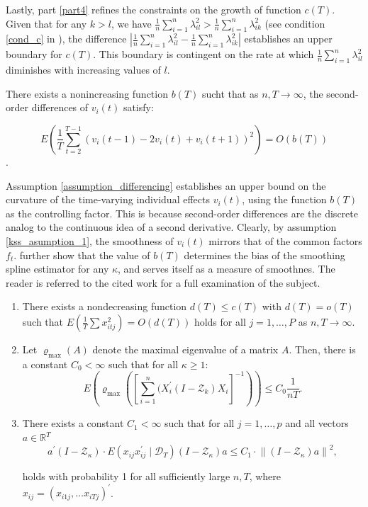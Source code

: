    Lastly, part \ref{part4} refines the constraints on the growth of function \(c(T)\). Given that for any \(k > l\), we have \(\frac{1}{n}\sum_{i=1}^n \lambda_{il}^2 > \frac{1}{n}\sum_{i=1}^n \lambda_{ik}^2\) (see condition \ref{cond_c} in ), the difference \(|\frac{1}{n}\sum_{i=1}^n \lambda_{il}^2 - \frac{1}{n}\sum_{i=1}^n \lambda_{ik}^2|\) establishes an upper boundary for \(c(T)\). This boundary is contingent on the rate at which \(\frac{1}{n}\sum_{i=1}^n \lambda_{il}^2\) diminishes with increasing values of \(l\).
    \begin{assumption}\label{assumption_differencing}
        There exists a nonincreasing function $b(T)$ sucht that as $n, T \to \infty$, the second-order differences of $v_i(t)$ satisfy:

        $$ E \left( \frac{1}{T} \sum_{t=2}^{T-1} \left(v_i(t-1) - 2v_i(t) + v_i(t+1) \right)^2 \right) = O(b(T))$$.
    \end{assumption}
     Assumption \ref{assumption_differencing} establishes an upper bound on the curvature of the time-varying individual effects \( v_i(t) \), using the function \( b(T) \) as the controlling factor. This is because second-order differences are the discrete analog to the continuous idea of a second derivative. Clearly, by assumption \ref{kss_asumption_1}, the smoothness of $v_i(t)$ mirrors that of the common factors $f_t$. \citet{kneip2012new} further show that the value of $b(T)$ determines the bias of the smoothing spline estimator for any $\kappa$, and serves itself as a measure of smoothnes. The reader is referred to the cited work for a full examination of the subject. 
    \begin{assumption}\label{assumption_X}
    \begin{enumerate} [label = (\roman*)] The following conditions are satisfied: 
        \item There exists a nondecreasing function $d(T) \leq c(T)$ with $d(T) = o(T)$ such that $ E(\frac{1}{T} \sum x_{itj}^2) = O(d(T))$ holds for all $j = 1, \ldots, P$ as $n, T \to \infty$.\label{first}
        \item  Let $\varrho_{\text{max}}(A)$ denote the maximal eigenvalue of a matrix $A$. Then, there is a constant $C_0 < \infty$ such that for all $\kappa \geq 1$:
        $$ E \left( \varrho_{\max} \left( \left[ \sum_{i=1}^n ( X_i ^\prime (I - \mathcal{Z}_k) X_i \right]^{-1} \right) \right) \leq C_0 \frac{1}{nT} . $$ \label{second}

        
        \item There exists a constant $C_1<\infty$ such that for all $j=1, \ldots, p$ and all vectors $a \in \mathbb{R}^T$
        $$
        a^{\prime}\left(I-\mathcal{Z}_\kappa\right) \cdot E\left(x_{ij}x_{ij}^{\prime} \mid \mathcal{D}_T\right)\left(I-\mathcal{Z}_\kappa\right) a \leq C_1 \cdot\left\|\left(I-\mathcal{Z}_\kappa\right) a\right\|^2,
        $$

        holds with probability 1 for all sufficiently large $n, T$, where $x_{ij} = (x_{i1j},  \ldots x_{iTj})^{\prime}$.\label{third}
    \end{enumerate}
    \end{assumption}
